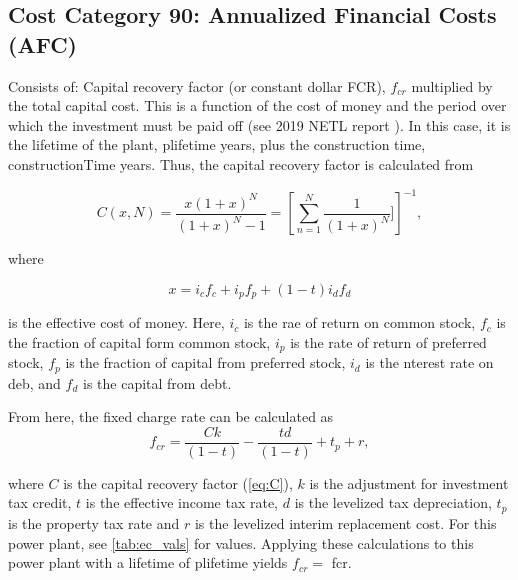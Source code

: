 \subsection{Cost Category 90: Annualized Financial Costs (AFC)}


Consists of: Capital recovery factor (or constant dollar FCR), $f_{cr}$ multiplied by the total capital cost. This is a function of the cost of money and the period over which the investment must be paid off (see 2019 NETL report \cite{NETL2019a}). In this case, it is the lifetime of the plant, plifetime years, plus the construction time, constructionTime years. Thus, the capital recovery factor is calculated from 

\begin{equation}
    C(x,N) = \frac{x(1+x)^N}{(1+x)^N-1} = \left[ \sum_{n=1}^N \frac{1}{(1+x)^N}] \right] ^{-1},
    \label{eq:C}
\end{equation}

where 

\begin{equation}
    x = i_cf_c + i_pf_p +(1-t)i_df_d
\end{equation}

is the effective cost of money. Here, $i_c$ is the rae of return on common stock, $f_c$ is the fraction of capital form common stock, $i_p$ is the rate of return of preferred stock, $f_p$ is the fraction of capital from preferred stock, $i_d$ is the nterest rate on deb, and $f_d$ is the capital from debt. 

From here, the fixed charge rate can be calculated as 
\begin{equation}
    f_{cr} = \frac{Ck}{(1-t)} - \frac{td}{(1-t)} + t_p + r,
\end{equation}

where $C$ is the capital recovery factor (\ref{eq:C}), $k$ is the adjustment for investment tax credit, $t$ is the effective income tax rate, $d$ is the levelized tax depreciation, $t_p$ is the property tax rate and $r$ is the levelized interim replacement cost. For this power plant, see \ref{tab:ec_vals} for values. Applying these calculations to this power plant with a lifetime of plifetime yields $f_{cr} = $ fcr.\\


